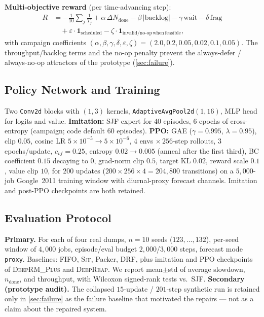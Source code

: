 \documentclass[runningheads]{llncs}
\newcommand{\deeprm}{\textsc{DeepRM\_Plus}}
\newcommand{\deepreap}{\textsc{DeepReap}}
\newcommand{\sjf}{\textsc{Sjf}}
\begin{document}
\textbf{Multi-objective reward} (per time-advancing step):
\begin{equation}
\begin{aligned}
R &= -\frac{1}{10}\sum_j \frac{1}{T_j}
   + \alpha\,\Delta N_{\mathrm{done}}
   - \beta\,|\mathrm{backlog}|
   - \gamma\,\overline{\mathrm{wait}}
   - \delta\,\mathrm{frag}\\
&\quad + \varepsilon\cdot\mathbf{1}_{\mathrm{scheduled}}
   - \zeta\cdot\mathbf{1}_{\mathrm{invalid/no\text{-}op\,when\,feasible}},
\end{aligned}
\label{eq:reward}
\end{equation}
with campaign coefficients
$(\alpha,\beta,\gamma,\delta,\varepsilon,\zeta)=(2.0,0.2,0.05,0.02,0.1,0.05)$.
The throughput/backlog terms and the no-op penalty prevent the
always-defer / always-no-op attractors of the prototype
(\cref{sec:failure}).

\subsection{Policy Network and Training}\label{sec:training}
Two \texttt{Conv2d} blocks with $(1,3)$ kernels,
\texttt{AdaptiveAvgPool2d}$(1,16)$, MLP head for logits and value.
\textbf{Imitation:} SJF expert for $40$ episodes, $6$ epochs of
cross-entropy (campaign; code default $60$ episodes).
\textbf{PPO:} GAE ($\gamma{=}0.995$, $\lambda{=}0.95$), clip $0.05$,
cosine LR $5{\times}10^{-5}\!\to\!5{\times}10^{-6}$, $4$ envs
$\times\,256$-step rollouts, $3$ epochs/update, $c_{vf}{=}0.25$,
entropy $0.02\!\to\!0.005$ (anneal after the first third), BC
coefficient $0.15$ decaying to $0$, grad-norm clip $0.5$, target KL
$0.02$, reward scale $0.1$, value clip $10$, for $200$ updates
($200{\times}256{\times}4=204{,}800$ transitions) on a $5{,}000$-job
Google~2011 training window with diurnal-proxy forecast channels.
Imitation and post-PPO checkpoints are both retained.

\subsection{Evaluation Protocol}\label{sec:metrics}
\textbf{Primary.} For each of four real dumps, $n{=}10$ seeds
($123,\ldots,132$), per-seed window of $4{,}000$ jobs, episode/eval
budget $2{,}000$/$3{,}000$ steps, forecast mode \texttt{proxy}.
Baselines: FIFO, \sjf{}, Packer, DRF, plus imitation and PPO
checkpoints of \deeprm{} and \deepreap{}. We report mean$\pm$std of
average slowdown, $n_{\mathrm{done}}$, and throughput, with Wilcoxon
signed-rank tests vs.\ SJF.
\textbf{Secondary (prototype audit).} The collapsed $15$-update /
$201$-step synthetic run is retained only in \cref{sec:failure} as the
failure baseline that motivated the repairs --- not as a claim about
the repaired system.
\end{document}
